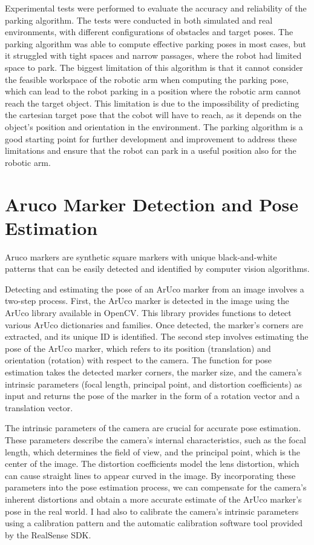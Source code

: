 Experimental tests were performed to evaluate the accuracy and reliability of the parking algorithm.
The tests were conducted in both simulated and real environments, with different configurations of obstacles
and target poses. The parking algorithm was able to compute effective parking poses in most cases,
but it struggled with tight spaces and narrow passages, where the robot had limited space to park.
The biggest limitation of this algorithm is that it cannot consider the feasible workspace of the robotic arm
when computing the parking pose, which can lead to the robot parking in a position where the robotic arm
cannot reach the target object. This limitation is due to the impossibility of predicting the cartesian
target pose that the cobot will have to reach, as it depends on the object's position and orientation
in the environment. The parking algorithm is a good starting point for further development and improvement
to address these limitations and ensure that the robot can park in a useful position also for the robotic arm.

\section{Aruco Marker Detection and Pose Estimation}

Aruco markers are synthetic square markers with unique black-and-white patterns that can be easily detected
and identified by computer vision algorithms.

Detecting and estimating the pose of an ArUco marker from an image involves a two-step process.
First, the ArUco marker is detected in the image using the ArUco library available in OpenCV. 
This library provides functions to detect various ArUco dictionaries and families. 
Once detected, the marker's corners are extracted, and its unique ID is identified. 
The second step involves estimating the pose of the ArUco marker, which refers to its position 
(translation) and orientation (rotation) with respect to the camera. The function for pose estimation 
takes the detected marker corners, the marker size, and the camera's intrinsic parameters (focal length,
principal point, and distortion coefficients) as input and returns the pose of the marker in the form of a rotation
vector and a translation vector.

The intrinsic parameters of the camera are crucial for accurate pose estimation. These parameters describe the camera's
internal characteristics, such as the focal length, which determines the field of view, and the principal point,
which is the center of the image. The distortion coefficients model the lens distortion, which can cause straight
lines to appear curved in the image. By incorporating these parameters into the pose estimation process,
we can compensate for the camera's inherent distortions and obtain a more accurate estimate of the ArUco marker's pose
in the real world. I had also to calibrate the camera's intrinsic parameters using a calibration pattern and the
automatic calibration software tool provided by the RealSense SDK.

